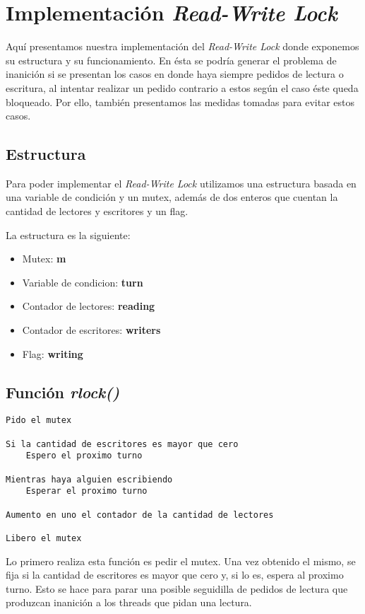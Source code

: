 \section{Implementación \textit{Read-Write Lock}}

Aquí presentamos nuestra implementación del \textit{Read-Write Lock} donde exponemos su estructura y su funcionamiento. En ésta se podría generar el problema de inanición si se presentan los casos en donde haya siempre pedidos de lectura o escritura, al intentar realizar un pedido contrario a estos según el caso éste queda bloqueado. Por ello, también presentamos las medidas tomadas para evitar estos casos.


\subsection{Estructura}

Para poder implementar el \textit{Read-Write Lock} utilizamos una estructura basada en una variable de condición y un mutex, además de dos enteros que cuentan la cantidad de lectores y escritores y un flag.

La estructura es la siguiente:

\begin{itemize}
	\item Mutex: \textbf{m}
	\item Variable de condicion: \textbf{turn}
	\item Contador de lectores: \textbf{reading}
	\item Contador de escritores: \textbf{writers}
	\item Flag: \textbf{writing}
\end{itemize}


\subsection{Función \textit{rlock()}}

\begin{lstlisting}
Pido el mutex

Si la cantidad de escritores es mayor que cero
	Espero el proximo turno

Mientras haya alguien escribiendo
	Esperar el proximo turno

Aumento en uno el contador de la cantidad de lectores

Libero el mutex
\end{lstlisting}

Lo primero realiza esta función es pedir el mutex. Una vez obtenido el mismo, se fija si la cantidad de escritores es mayor que cero y, si lo es, espera al proximo turno. Esto se hace para parar una posible seguidilla de pedidos de lectura que produzcan inanición a los threads que pidan una lectura.

